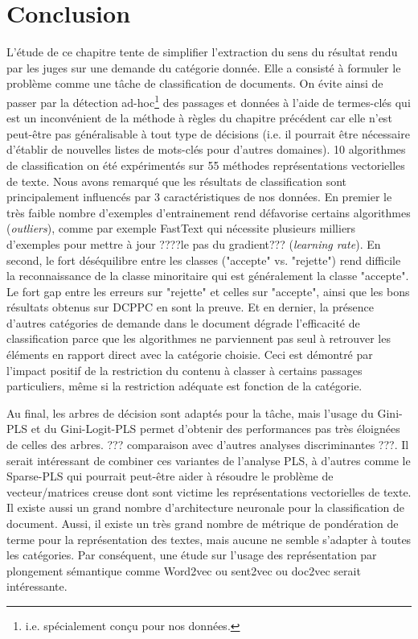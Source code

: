 \section{Conclusion}
\label{sec:sensresultat:conclusion}
L'étude de ce chapitre tente de simplifier l'extraction du sens du résultat rendu par les juges sur une demande du catégorie donnée. Elle a consisté à formuler le problème comme une tâche de classification de documents. On évite ainsi de passer par la détection ad-hoc\footnote{i.e. spécialement conçu pour nos données.} des passages et données à l'aide de termes-clés qui est un inconvénient de la méthode à règles du chapitre précédent car elle n'est peut-être pas généralisable à tout type de décisions (i.e. il pourrait être nécessaire d'établir de nouvelles listes de mots-clés pour d'autres domaines). 10 algorithmes de classification on été expérimentés sur 55 méthodes représentations vectorielles de texte. Nous avons remarqué que les résultats de classification sont principalement influencés par 3 caractéristiques de nos données. En premier le très faible nombre d'exemples d'entrainement rend défavorise certains algorithmes (\textit{outliers}), comme par exemple FastText qui nécessite plusieurs milliers d'exemples pour mettre à jour ????le pas du gradient??? (\textit{learning rate}). En second, le fort déséquilibre entre les classes ("accepte" vs. "rejette") rend difficile la reconnaissance de la classe minoritaire qui est généralement la classe "accepte". Le fort gap entre les erreurs sur "rejette" et celles sur "accepte", ainsi que les bons résultats obtenus sur DCPPC en sont la preuve. Et en dernier, la présence d'autres catégories de demande dans le document dégrade l'efficacité de classification parce que les algorithmes ne parviennent pas seul à retrouver les éléments en rapport direct avec la catégorie choisie. Ceci est démontré par l'impact positif de la restriction du contenu à classer à certains passages particuliers, même si la restriction adéquate est fonction de la catégorie.
 
Au final, les arbres de décision sont adaptés pour la tâche, mais l'usage du Gini-PLS et du Gini-Logit-PLS permet d'obtenir des performances pas très éloignées de celles des arbres. ??? comparaison avec d'autres analyses discriminantes ???. Il serait intéressant de combiner ces variantes de l'analyse PLS, à d'autres comme le Sparse-PLS qui pourrait peut-être aider à résoudre le problème de vecteur/matrices creuse dont sont victime les représentations vectorielles de texte. Il existe aussi un grand nombre d'architecture neuronale pour la classification de document. Aussi, il existe un très grand nombre de métrique de pondération de terme pour la représentation des textes, mais aucune ne semble s'adapter à toutes les catégories. Par conséquent, une étude sur l'usage des représentation par plongement sémantique comme Word2vec ou sent2vec ou doc2vec serait intéressante.